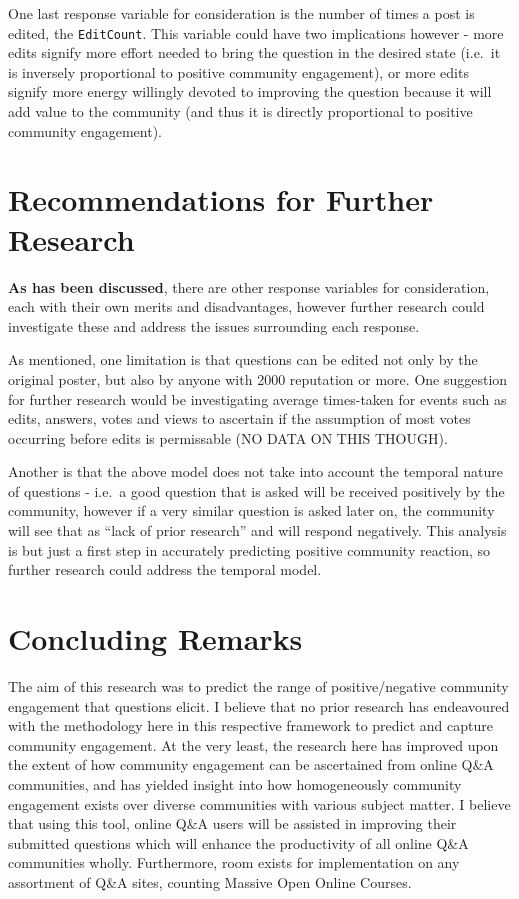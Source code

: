 \documentclass[11pt,preprint, authoryear]{article}
\numberwithin{equation}{section}
\numberwithin{figure}{section}
\begin{document}
One last response variable for consideration is the number of times a
post is edited, the \texttt{EditCount}. This variable could have two
implications however - more edits signify more effort needed to bring
the question in the desired state (i.e.~it is inversely proportional to
positive community engagement), or more edits signify more energy
willingly devoted to improving the question because it will add value to
the community (and thus it is directly proportional to positive
community engagement).

\newpage

\section{\texorpdfstring{Recommendations for Further Research
\label{Recom}}{Recommendations for Further Research }}\label{recommendations-for-further-research}

\textbf{As has been discussed}, there are other response variables for
consideration, each with their own merits and disadvantages, however
further research could investigate these and address the issues
surrounding each response.

As mentioned, one limitation is that questions can be edited not only by
the original poster, but also by anyone with 2000 reputation or more.
One suggestion for further research would be investigating average
times-taken for events such as edits, answers, votes and views to
ascertain if the assumption of most votes occurring before edits is
permissable (NO DATA ON THIS THOUGH).

Another is that the above model does not take into account the temporal
nature of questions - i.e.~a good question that is asked will be
received positively by the community, however if a very similar question
is asked later on, the community will see that as ``lack of prior
research'' and will respond negatively. This analysis is but just a
first step in accurately predicting positive community reaction, so
further research could address the temporal model.

\newpage

\section{\texorpdfstring{Concluding Remarks
\label{Concl}}{Concluding Remarks }}\label{concluding-remarks}

The aim of this research was to predict the range of positive/negative
community engagement that questions elicit. I believe that no prior
research has endeavoured with the methodology here in this respective
framework to predict and capture community engagement. At the very
least, the research here has improved upon the extent of how community
engagement can be ascertained from online Q\&A communities, and has
yielded insight into how homogeneously community engagement exists over
diverse communities with various subject matter. I believe that using
this tool, online Q\&A users will be assisted in improving their
submitted questions which will enhance the productivity of all online
Q\&A communities wholly. Furthermore, room exists for implementation on
any assortment of Q\&A sites, counting Massive Open Online Courses.
\end{document}

